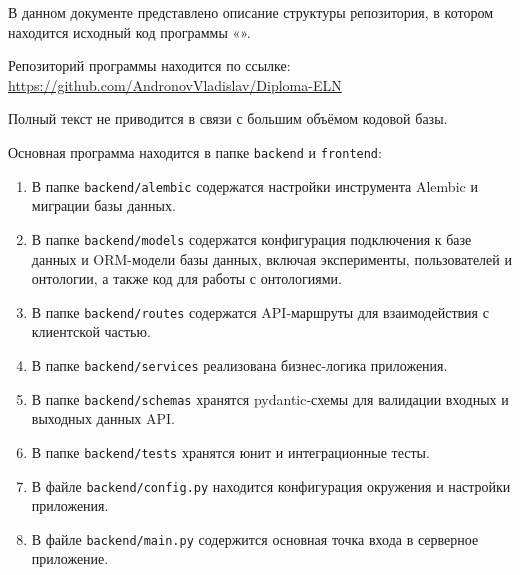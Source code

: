 \documentclass[a4paper,12pt,reqno]{article}
\begin{document}
    \project{\unskip}

    \firstPage
    \newpage
    \secondPage
    \newpage
    \thirdPage
    \newpage


    В данном документе представлено описание структуры репозитория, в котором
    находится исходный код программы «\unskip».

    Репозиторий программы находится по ссылке:
    \hyperlink{https://github.com/AndronovVladislav/Diploma-ELN}{https://github.com/AndronovVladislav/Diploma-ELN}

    Полный текст не приводится в связи с большим объёмом кодовой базы.

    Основная программа находится в папке \texttt{backend} и \texttt{frontend}:
    
    \begin{enumerate}
        \item В папке \texttt{backend/alembic} содержатся настройки инструмента Alembic и миграции базы данных.
        \item В папке \texttt{backend/models} содержатся конфигурация подключения к базе данных и ORM-модели базы данных, включая эксперименты, пользователей и онтологии, а также код для работы с онтологиями.
        \item В папке \texttt{backend/routes} содержатся API-маршруты для взаимодействия с клиентской частью.
        \item В папке \texttt{backend/services} реализована бизнес-логика приложения.
        \item В папке \texttt{backend/schemas} хранятся pydantic-схемы для валидации входных и выходных данных API.
        \item В папке \texttt{backend/tests} хранятся юнит и интеграционные тесты.
        \item В файле \texttt{backend/config.py} находится конфигурация окружения и настройки приложения.
        \item В файле \texttt{backend/main.py} содержится основная точка входа в серверное приложение.
    \end{enumerate}
    
\end{document}
